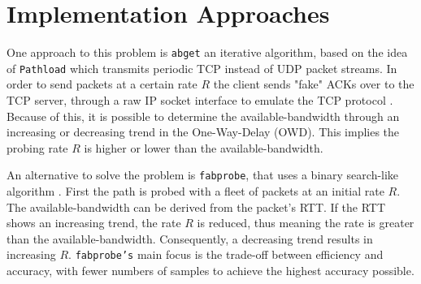 \documentclass[NET,a4,12pt,english]{netforms}
\begin{document}
\section*{Implementation Approaches}

One approach to this problem is \texttt{abget} an iterative algorithm, based on the idea of \texttt{Pathload} which transmits periodic TCP instead of UDP packet streams. In order to send packets at a certain rate $R$ the client sends "fake" ACKs over to the TCP server, through a raw IP socket interface to emulate the TCP protocol \cite{proceedings:passivactivemeas} .
Because of this, it is possible to determine the available-bandwidth through an increasing or decreasing trend in the One-Way-Delay (OWD). This implies the probing rate $R$ is higher or lower than the available-bandwidth.

An alternative to solve the problem is \texttt{fabprobe}, that uses a binary search-like algorithm \cite{fabprobe}. %
First the path is probed with a fleet of packets at an initial rate $R$. The available-bandwidth can be derived from the packet's RTT. If the RTT shows an increasing trend, the rate $R$ is reduced, thus meaning the rate is greater than the available-bandwidth. Consequently, a decreasing trend results in increasing $R$. \texttt{fabprobe's} main focus is the trade-off between efficiency and accuracy, with fewer numbers of samples to achieve the highest accuracy possible.
\end{document}
